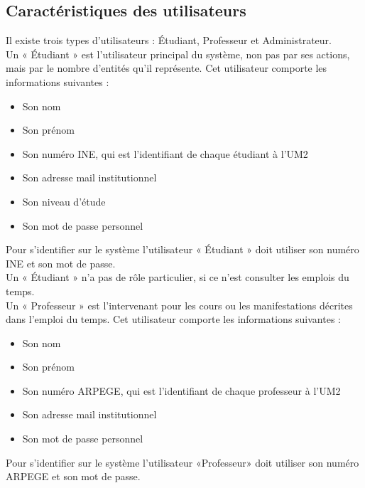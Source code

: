 \documentclass[a4paper, 11pt]{article}
\begin{document}
        \subsection{ Caractéristiques des utilisateurs}
        Il existe trois types d'utilisateurs : Étudiant, Professeur et Administrateur.\\Un « Étudiant » est l'utilisateur principal du système, non pas par ses actions, mais par le nombre d'entités qu'il représente. Cet utilisateur comporte les informations suivantes :
        \begin{itemize}
        \item Son nom
        \item Son prénom
        \item Son numéro INE, qui est l'identifiant de chaque étudiant à l'UM2
        \item Son adresse mail institutionnel
        \item Son niveau d'étude
        \item Son mot de passe personnel
        \end{itemize}
Pour s'identifier sur le système l'utilisateur « Étudiant » doit utiliser son numéro INE et son mot de passe.\\Un « Étudiant » n'a pas de rôle particulier, si ce n'est consulter les emplois du temps.
\\Un « Professeur » est l'intervenant pour les cours ou les manifestations décrites dans l'emploi du temps. Cet utilisateur comporte les informations suivantes :
        \begin{itemize}
        \item Son nom
        \item Son prénom
        \item Son numéro ARPEGE, qui est l'identifiant de chaque professeur à l'UM2
        \item Son adresse mail institutionnel
        \item Son mot de passe personnel
        \end{itemize}
Pour s'identifier sur le système l'utilisateur «Professeur» doit utiliser son numéro ARPEGE et son mot de passe.\\
\end{document}
